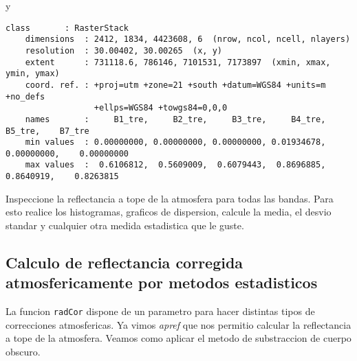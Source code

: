 \begin{exa}
    y

    \begin{Verbatim}[fontsize=\small]
    class       : RasterStack
    dimensions  : 2412, 1834, 4423608, 6  (nrow, ncol, ncell, nlayers)
    resolution  : 30.00402, 30.00265  (x, y)
    extent      : 731118.6, 786146, 7101531, 7173897  (xmin, xmax, ymin, ymax)
    coord. ref. : +proj=utm +zone=21 +south +datum=WGS84 +units=m +no_defs
                  +ellps=WGS84 +towgs84=0,0,0
    names       :     B1_tre,     B2_tre,     B3_tre,     B4_tre,     B5_tre,    B7_tre
    min values  : 0.00000000, 0.00000000, 0.00000000, 0.01934678, 0.00000000,    0.00000000
    max values  :  0.6106812,  0.5609009,  0.6079443,  0.8696885,  0.8640919,    0.8263815
    \end{Verbatim}

    \end{exa}

\begin{act}
    Inspeccione la reflectancia a tope de la atmosfera para todas las bandas.
    Para esto realice los histogramas, graficos de dispersion, calcule la media,
    el desvio standar y cualquier otra medida estadistica que le guste.
\end{act}
\subsection{Calculo de reflectancia corregida atmosfericamente por metodos
            estadisticos}

La funcion \texttt{radCor} dispone de un parametro para hacer distintas
tipos de correcciones atmosfericas. Ya vimos \emph{apref} que nos permitio
calcular la reflectancia a tope de la atmosfera. Veamos como aplicar el metodo
de substraccion de cuerpo obscuro.

